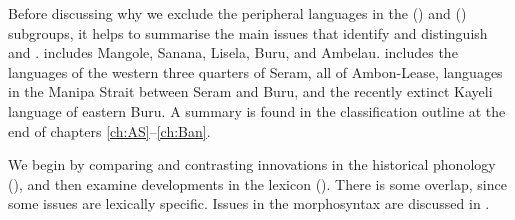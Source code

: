 Before discussing why we exclude the peripheral languages in
the  () and  () subgroups,
it helps to summarise the main issues that identify
and distinguish  and .
 includes Mangole, Sanana,
Lisela, Buru, and Ambelau.
 includes the languages of the western three
quarters of Seram, all of Ambon-Lease, languages in the Manipa Strait between Seram
and Buru, and the recently extinct Kayeli language of eastern Buru.
A summary is found in the classification outline
at the end of chapters \ref{ch:AS}--\ref{ch:Ban}.

We begin by comparing
and contrasting innovations in the historical phonology (),
and then examine developments in the lexicon ().
There is some overlap,
since some issues are lexically specific.
Issues in the morphosyntax are discussed in .